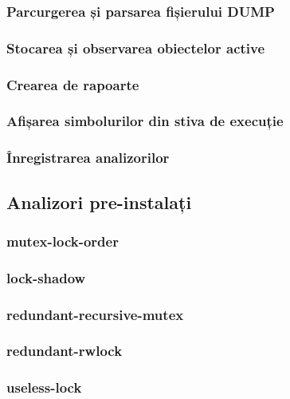 \subsubsection{Parcurgerea și parsarea fișierului DUMP}
\subsubsection{Stocarea și observarea obiectelor active}
\subsubsection{Crearea de rapoarte}
\subsubsection{Afișarea simbolurilor din stiva de execuție}
\subsubsection{Înregistrarea analizorilor}
\subsection{Analizori pre-instalați}
\subsubsection{mutex-lock-order}
\subsubsection{lock-shadow}
\subsubsection{redundant-recursive-mutex}
\subsubsection{redundant-rwlock}
\subsubsection{useless-lock}
